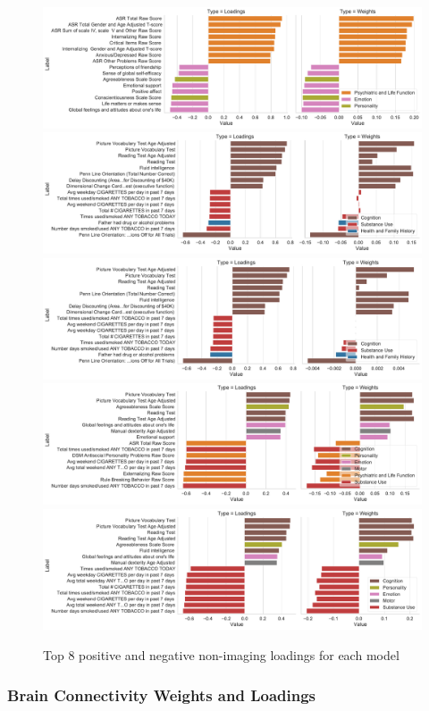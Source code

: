 \begin{figure}
\centering
\includegraphics[width=0.8\linewidth]{figures/hcp/PCA behaviour weights and loadings}
\includegraphics[width=0.8\linewidth]{figures/hcp/RCCA behaviour weights and loadings}
\includegraphics[width=0.8\linewidth]{figures/hcp/ElasticNet behaviour weights and loadings}
\includegraphics[width=0.8\linewidth]{figures/hcp/PLS behaviour weights and loadings}
\includegraphics[width=0.8\linewidth]{figures/hcp/SPLS behaviour weights and loadings}
\caption{Top 8 positive and negative non-imaging \gls{loadings} for each model}
\end{figure}

\subsubsection{Brain Connectivity Weights and Loadings}

